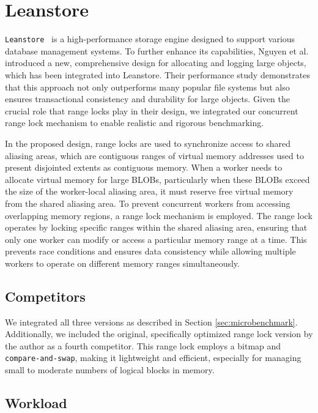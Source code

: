 \newpage

\section{Leanstore}\label{sec:leanstore}

\texttt{Leanstore}~\parencite{leis2018leanstore} is a high-performance storage engine designed to support various database management systems. To further enhance its capabilities, Nguyen et al.~\parencite{nguyen2024files} introduced a new, comprehensive design for allocating and logging large objects, which has been integrated into Leanstore. Their performance study demonstrates that this approach not only outperforms many popular file systems but also ensures transactional consistency and durability for large objects. Given the crucial role that range locks play in their design, we integrated our concurrent range lock mechanism to enable realistic and rigorous benchmarking.

In the proposed design, range locks are used to synchronize access to shared aliasing areas, which are contiguous ranges of virtual memory addresses used to present disjointed extents as contiguous memory. When a worker needs to allocate virtual memory for large BLOBs, particularly when these BLOBs exceed the size of the worker-local aliasing area, it must reserve free virtual memory from the shared aliasing area. To prevent concurrent workers from accessing overlapping memory regions, a range lock mechanism is employed. The range lock operates by locking specific ranges within the shared aliasing area, ensuring that only one worker can modify or access a particular memory range at a time. This prevents race conditions and ensures data consistency while allowing multiple workers to operate on different memory ranges simultaneously. 

\subsection{Competitors}

We integrated all three versions as described in Section \ref{sec:microbenchmark}. Additionally, we included the original, specifically optimized range lock version by the author as a fourth competitor. This range lock employs a bitmap and \texttt{compare-and-swap}, making it lightweight and efficient, especially for managing small to moderate numbers of logical blocks in memory.

\subsection{Workload}

